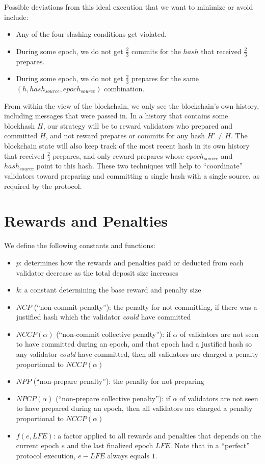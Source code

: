 \documentclass[12pt]{article}
\begin{document}
Possible deviations from this ideal execution that we want to minimize or avoid include:

\begin{itemize}
\item Any of the four slashing conditions get violated.
\item During some epoch, we do not get $\frac{2}{3}$ commits for the $hash$ that received $\frac{2}{3}$ prepares.
\item During some epoch, we do not get $\frac{2}{3}$ prepares for the same \\ $(h, hash_{source}, epoch_{source})$ combination.
\end{itemize}

From within the view of the blockchain, we only see the blockchain's own history, including messages that were passed in. In a history that contains some blockhash $H$, our strategy will be to reward validators who prepared and committed $H$, and not reward prepares or commits for any hash $H\prime \ne H$. The blockchain state will also keep track of the most recent hash in its own history that received $\frac{2}{3}$ prepares, and only reward prepares whose $epoch_{source}$ and $hash_{source}$ point to this hash. These two techniques will help to ``coordinate'' validators toward preparing and committing a single hash with a single source, as required by the protocol.

\section{Rewards and Penalties}

We define the following constants and functions:

\begin{itemize}
\item $p$: determines how the rewards and penalties paid or deducted from each validator decrease as the total deposit size increases
\item $k$: a constant determining the base reward and penalty size
\item $NCP$ (``non-commit penalty''): the penalty for not committing, if there was a justified hash which the validator \textit{could} have committed
\item $NCCP(\alpha)$ (``non-commit collective penalty''): if $\alpha$ of validators are not seen to have committed during an epoch, and that epoch had a justified hash so any validator \textit{could} have committed, then all validators are charged a penalty proportional to $NCCP(\alpha)$
\item $NPP$ (``non-prepare penalty''): the penalty for not preparing
\item $NPCP(\alpha)$ (``non-prepare collective penalty''): if $\alpha$ of validators are not seen to have prepared during an epoch, then all validators are charged a penalty proportional to $NCCP(\alpha)$
\item $f(e, LFE)$: a factor applied to all rewards and penalties that depends on the current epoch $e$ and the last finalized epoch $LFE$. Note that in a ``perfect'' protocol execution, $e - LFE$ always equals $1$.
\end{itemize}
\end{document}
